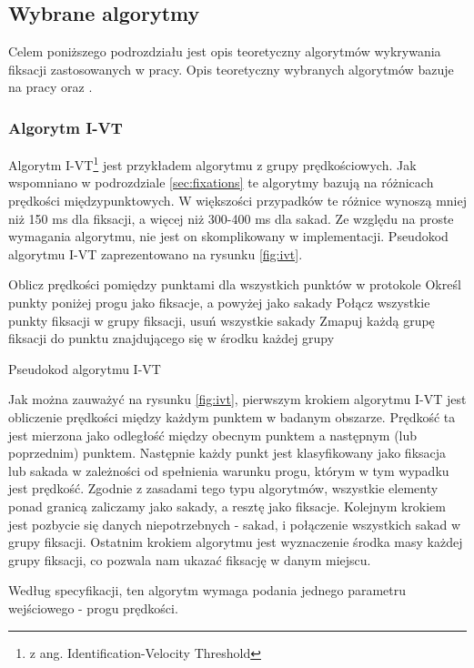 \subsection{Wybrane algorytmy}
\label{ssec:algorithms}
Celem poniższego podrozdziału jest opis teoretyczny algorytmów wykrywania fiksacji zastosowanych w pracy. Opis teoretyczny wybranych algorytmów bazuje na pracy \cite{Main} oraz \cite{EvaluationMethodology}.
\subsubsection{Algorytm I-VT}
\label{ssec:ivt}
Algorytm I-VT\footnote{z ang. Identification-Velocity Threshold} jest przykładem algorytmu z grupy prędkościowych. Jak wspomniano w podrozdziale \ref{sec:fixations} te algorytmy bazują na różnicach prędkości międzypunktowych. W większości przypadków te różnice wynoszą mniej niż 150 ms dla fiksacji, a więcej niż 300-400 ms dla sakad. Ze względu na proste wymagania algorytmu, nie jest on skomplikowany w implementacji. Pseudokod algorytmu I-VT zaprezentowano na rysunku \ref{fig:ivt}.
{
\begin{algorithm}[H]
    \SetAlgoLined
    Oblicz prędkości pomiędzy punktami dla wszystkich punktów w protokole\;
    Określ punkty poniżej progu jako fiksacje, a powyżej jako sakady\;
    Połącz wszystkie punkty fiksacji w grupy fiksacji, usuń wszystkie sakady\;
    Zmapuj każdą grupę fiksacji do punktu znajdującego się w środku każdej grupy\;
    \;
    \caption{Pseudokod algorytmu I-VT}
    \label{fig:ivt}
\end{algorithm}}
Jak można zauważyć na rysunku \ref{fig:ivt}, pierwszym krokiem algorytmu I-VT jest obliczenie prędkości między każdym punktem w badanym obszarze. Prędkość ta jest mierzona jako odległość między obecnym punktem a następnym (lub poprzednim) punktem. Następnie każdy punkt jest klasyfikowany jako fiksacja lub sakada w zależności od spełnienia warunku progu, którym w tym wypadku jest prędkość. Zgodnie z zasadami tego typu algorytmów, wszystkie elementy ponad granicą zaliczamy jako sakady, a resztę jako fiksacje. Kolejnym krokiem jest pozbycie się danych niepotrzebnych - sakad, i połączenie wszystkich sakad w grupy fiksacji. Ostatnim krokiem algorytmu jest wyznaczenie środka masy każdej grupy fiksacji, co pozwala nam ukazać fiksację w danym miejscu.\par
Według specyfikacji, ten algorytm wymaga podania jednego parametru wejściowego - progu prędkości.

